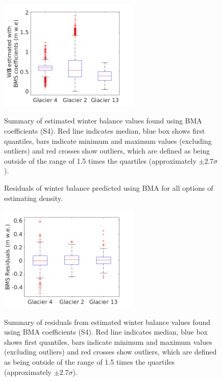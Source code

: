 \documentclass{sfuthesis}
\newcommand{\boxMatlab}{Red line indicates median, blue box shows first quantiles, bars indicate minimum and maximum values (excluding outliers) and red crosses show outliers, which are defined as being outside of the range of 1.5 times the quartiles (approximately $\pm2.7\sigma$). }
\begin{document}
\begin{figure}
\centering
	\includegraphics[width =0.6\textwidth]{ModelledSWE_box_BMS.png}\\
\caption{Summary of estimated winter balance values found using BMA coefficients (S4). \boxMatlab}
\label{fig:BMAsweboxplot}
\end{figure} 

\begin{figure}
	\caption{Residuals of winter balance predicted using BMA for all options of estimating density.}
	\label{fig:BMSresiduals_all}
\end{figure}

\begin{figure}
\centering
	\includegraphics[width =0.6\textwidth]{residuals_box_BMS.png}\\
\caption{Summary of residuals from estimated winter balance values found using BMA coefficients (S4). \boxMatlab}
\label{fig:BMAresidualsboxplot}
\end{figure} 
\end{document}
